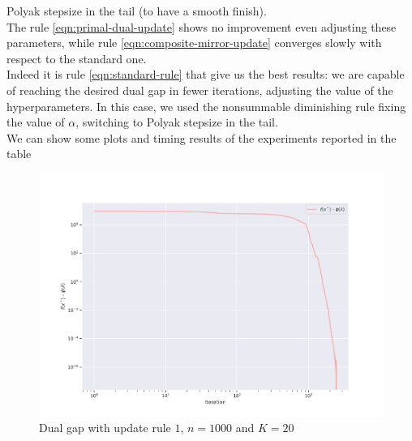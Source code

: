 \documentclass[notitlepage]{article}
\begin{document}
Polyak stepsize in the tail (to have a smooth finish).\\
The rule \eqref{eqn:primal-dual-update} shows no improvement even adjusting these parameters, while rule \eqref{eqn:composite-mirror-update} converges slowly with respect to the standard one.\\
Indeed it is rule \eqref{eqn:standard-rule} that give us the best results: we are capable of reaching the desired dual gap in fewer iterations, adjusting the value of the hyperparameters. In this case, we used the nonsummable diminishing rule 
fixing the value of $\alpha$, switching to Polyak stepsize in the tail.\\
We can show some plots and timing results of the experiments reported in the table


\hspace{0pt}
\vfill

\begin{figure}[H]
  \centering
  \includegraphics[scale=0.65]{pics/n=1000_K=20_gap_rule=1.png}
  \caption{Dual gap with update rule $1$, $n=1000$ and $K=20$}
  \label{fig:rule-1-n-1000-k-20-gap}
\end{figure}
\end{document}
